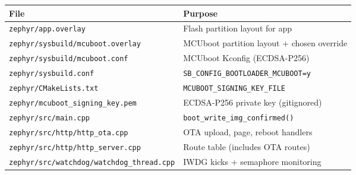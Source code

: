 \documentclass[11pt,a4paper]{article}
\begin{document}
\begin{center}
\begin{tabular}{@{}ll@{}}
\toprule
\textbf{File} & \textbf{Purpose} \\
\midrule
\texttt{zephyr/app.overlay}                   & Flash partition layout for app \\
\texttt{zephyr/sysbuild/mcuboot.overlay}      & MCUboot partition layout + chosen override \\
\texttt{zephyr/sysbuild/mcuboot.conf}         & MCUboot Kconfig (ECDSA-P256) \\
\texttt{zephyr/sysbuild.conf}                 & \texttt{SB\_CONFIG\_BOOTLOADER\_MCUBOOT=y} \\
\texttt{zephyr/CMakeLists.txt}                & \texttt{MCUBOOT\_SIGNING\_KEY\_FILE} \\
\texttt{zephyr/mcuboot\_signing\_key.pem}     & ECDSA-P256 private key (gitignored) \\
\texttt{zephyr/src/main.cpp}                  & \texttt{boot\_write\_img\_confirmed()} \\
\texttt{zephyr/src/http/http\_ota.cpp}        & OTA upload, page, reboot handlers \\
\texttt{zephyr/src/http/http\_server.cpp}     & Route table (includes OTA routes) \\
\texttt{zephyr/src/watchdog/watchdog\_thread.cpp} & IWDG kicks + semaphore monitoring \\
\bottomrule
\end{tabular}
\end{center}
\end{document}
